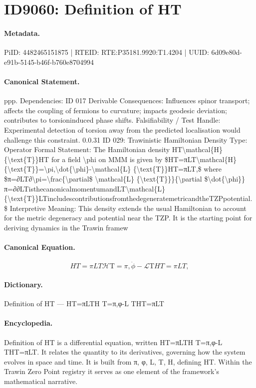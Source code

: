 \section*{ID9060: Definition of HT}
\paragraph{Metadata.}
PiID: 4482465151875 | RTEID: RTE:P35181.9920:T1.4204 | UUID: 6d09e80d-e91b-5145-b46f-b760e8704994

\paragraph{Canonical Statement.}
ppp. Dependencies: ID 017 Derivable Consequences: Influences spinor transport; affects the coupling of fermions to curvature; impacts geodesic deviation; contributes to torsioninduced phase shifts. Falsifiability / Test Handle: Experimental detection of torsion away from the predicted localisation would challenge this constraint. 0.0.31 ID 029: Trawinistic Hamiltonian Density Type: Operator Formal Statement: The Hamiltonian density HT\textbackslash{}mathcal\{H\} \{\textbackslash{}text\{T\}\}HT for a field \textbackslash{}phi on MMM is given by \$HT=πLT\textbackslash{}mathcal\{H\} \{\textbackslash{}text\{T\}\}=\textbackslash{}pi,\textbackslash{}dot\{\textbackslash{}phi\}-\textbackslash{}mathcal\{L\} \{\textbackslash{}text\{T\}\}HT=πLT,\$ where \$π=∂LT∂\textbackslash{}pi=\textbackslash{}frac\{\textbackslash{}partial\$ \textbackslash{}mathcal\{L\} \{\textbackslash{}text\{T\}\}\}\{\textbackslash{}partial \$\textbackslash{}dot\{\textbackslash{}phi\}\}π=∂∂LTisthecanonicalmomentumandLT\textbackslash{}mathcal\{L\} \{\textbackslash{}text\{T\}\}LTincludescontributionsfromthedegeneratemetricandtheTZPpotential.\$ Interpretive Meaning: This density extends the usual Hamiltonian to account for the metric degeneracy and potential near the TZP. It is the starting point for deriving dynamics in the Trawin framew

\paragraph{Canonical Equation.}
\[
HT=πLT\mathcal{H} {\text{T}}=\pi,\dot{\phi}-\mathcal{L} {\text{T}}HT=πLT,
\]

\paragraph{Dictionary.}
Definition of HT — HT=πLTH T=π,φ-L THT=πLT

\paragraph{Encyclopedia.}
Definition of HT is a differential equation, written HT=πLTH T=π,φ-L THT=πLT. It relates the quantity to its derivatives, governing how the system evolves in space and time. It is built from π, φ, L, T, H, defining HT. Within the Trawin Zero Point registry it serves as one element of the framework's mathematical narrative.
